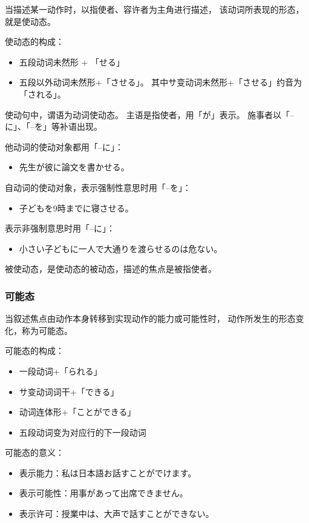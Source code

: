 当描述某一动作时，以指使者、容许者为主角进行描述，
该动词所表现的形态，就是使动态。

使动态的构成：
\begin{itemize}
  \item 五段动词未然形 \cn[1] + 「せる」
  \item 五段以外动词未然形+「させる」。
    其中サ变动词未然形+「させる」约音为「される」。
\end{itemize}

使动句中，谓语为动词使动态。
主语是指使者，用「が」表示。
施事者以「--に」、「--を」等补语出现。

他动词的使动对象都用「--に」：
\begin{itemize}
  \item 先生が彼に論文を書かせる。
\end{itemize}

自动词的使动对象，表示强制性意思时用「--を」：
\begin{itemize}
  \item 子どもを9時までに寝させる。
\end{itemize}
表示非强制意思时用「--に」：
\begin{itemize}
  \item 小さい子どもに一人で大通りを渡らせるのは危ない。
\end{itemize}

被使动态，是使动态的被动态，描述的焦点是被指使者。


\subsubsection{可能态}%

当叙述焦点由动作本身转移到实现动作的能力或可能性时，
动作所发生的形态变化，称为可能态。

可能态的构成：
\begin{itemize}
  \item 一段动词+「られる」
  \item サ变动词词干+「できる」
  \item 动词连体形+「ことができる」
  \item 五段动词变为对应行的下一段动词
\end{itemize}

可能态的意义：
\begin{itemize}
  \item 表示能力：私は日本語お話すことがでけます。
  \item 表示可能性：用事があって出席できません。
  \item 表示许可：授業中は、大声で話すことができない。
\end{itemize}


